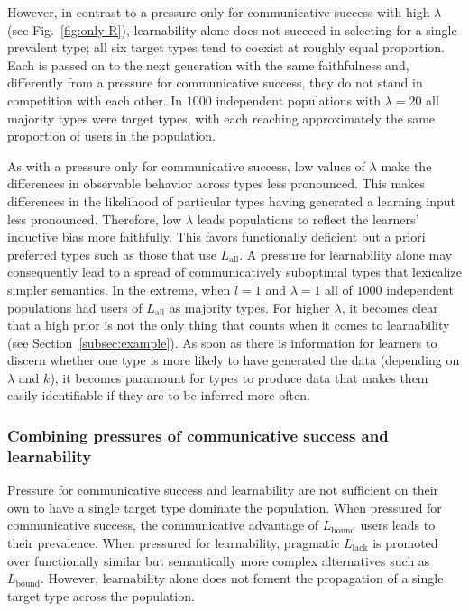 \documentclass[a4paper, 11pt]{article}
\theoremstyle{Satz}
\newcommand{\mylang}[1]{\ensuremath{L_{\text{#1}}}\xspace} %
\newcommand{\Lall}{\mylang{all}}
\newcommand{\Lbound}{\mylang{bound}}
\newcommand{\Llack}{\mylang{lack}}
\begin{document}
However, in contrast to a pressure only for communicative success with high $\lambda$ (see
Fig.~\ref{fig:only-R}), learnability alone does not succeed in selecting for a single
prevalent type; all six target types tend to coexist at roughly equal proportion. Each
is passed on to the next generation with the same faithfulness and, differently from a pressure
for communicative success, they do not stand in competition with each other. In $1000$
independent populations with $\lambda = 20$ all majority types were target types,
with each reaching approximately the same proportion of users in the population.

As with a pressure only for communicative success, low values of $\lambda$ make the differences in observable behavior across types less pronounced. This makes differences in the likelihood of particular types having generated a learning input less pronounced. Therefore, low $\lambda$ leads populations to reflect the learners' inductive bias more faithfully. This favors functionally deficient but a priori preferred types such as those that use  $\Lall$. A pressure for learnability alone may consequently lead to a spread of communicatively suboptimal types that lexicalize simpler semantics. In the extreme, when $l = 1$ and $\lambda = 1$ all
of $1000$ independent populations had users of $\Lall$ as majority types. For higher $\lambda$, it becomes clear that a high prior is not the only thing that counts when it comes to learnability (see Section~\ref{subsec:example}). As soon as there is information for learners to discern whether one type is more likely to have generated the data (depending on $\lambda$ and $k$), it becomes paramount for types to produce data that makes them easily identifiable if they are to be inferred more often.


\subsubsection{Combining pressures of communicative success and learnability}

Pressure for communicative success and learnability are not sufficient on their own to have a
single target type dominate the population. When pressured for communicative success, the  communicative advantage of $\Lbound$ users leads to their prevalence. When pressured for
learnability, pragmatic $\Llack$ is promoted over functionally similar but semantically more
complex alternatives such as $\Lbound$. However, learnability alone does not foment the
propagation of a single target type across the population.
\end{document}
